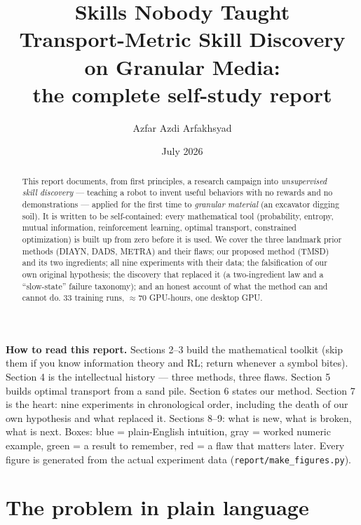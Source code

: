 \documentclass[11pt,a4paper]{article}
\title{\textbf{Skills Nobody Taught}\\[2mm]
\Large Transport-Metric Skill Discovery on Granular Media:\\ the complete self-study report}
\author{Azfar Azdi Arfakhsyad}
\date{July 2026}
\begin{document}
\maketitle

\begin{abstract}
\noindent
This report documents, from first principles, a research campaign into
\emph{unsupervised skill discovery} --- teaching a robot to invent useful behaviors
with no rewards and no demonstrations --- applied for the first time to
\emph{granular material} (an excavator digging soil). It is written to be
self-contained: every mathematical tool (probability, entropy, mutual information,
reinforcement learning, optimal transport, constrained optimization) is built up
from zero before it is used. We cover the three landmark prior methods (DIAYN,
DADS, METRA) and their flaws; our proposed method (TMSD) and its two ingredients;
all nine experiments with their data; the falsification of our own original
hypothesis; the discovery that replaced it (a two-ingredient law and a
``slow-state'' failure taxonomy); and an honest account of what the method can and
cannot do. 33 training runs, $\approx$70 GPU-hours, one desktop GPU.
\end{abstract}

\medskip
\begin{center}
\begin{minipage}{0.86\linewidth}\small
\textbf{How to read this report.} Sections 2--3 build the mathematical toolkit
(skip them if you know information theory and RL; return whenever a symbol
bites). Section 4 is the intellectual history --- three methods, three flaws.
Section 5 builds optimal transport from a sand pile. Section 6 states our
method. Section 7 is the heart: nine experiments in chronological order,
including the death of our own hypothesis and what replaced it. Sections 8--9:
what is new, what is broken, what is next. Boxes: \textcolor{intu}{blue} =
plain-English intuition, \textcolor{black!60}{gray} = worked numeric example,
\textcolor{good}{green} = a result to remember, \textcolor{warn}{red} = a flaw
that matters later. Every figure is generated from the actual experiment data
(\texttt{report/make\_figures.py}).
\end{minipage}
\end{center}

\tableofcontents
\newpage

\section{The problem in plain language}
\end{document}
